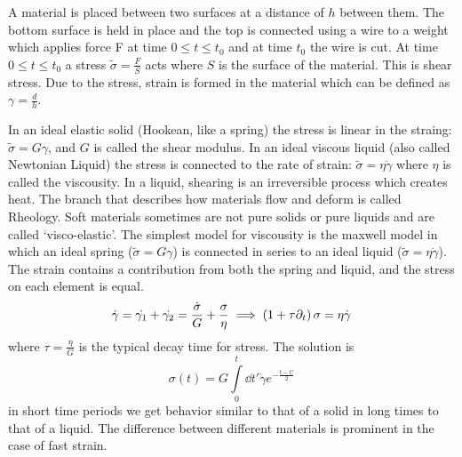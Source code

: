 
A material is placed between two surfaces at a distance of \(h\) between them. The bottom surface is held in place and the top is connected using a wire to a weight which applies force F at time \(0 \leq t \leq t_0\) and at time \(t_0\) the wire is cut. At time \(0 \leq t \leq t_0\) a stress \(\tilde{\sigma} = \frac{F}{S}\) acts where \(S\) is the surface of the material. This is shear stress. Due to the stress, strain is formed in the material which can be defined as \(\gamma = \frac{d}{h}\).


In an ideal elastic solid (Hookean, like a spring) the stress is linear in the straing: \(\tilde{\sigma} = G\gamma\), and \(G\) is called the shear modulus. In an ideal viscous liquid (also called Newtonian Liquid) the stress is connected to the rate of strain: \(\tilde{\sigma} = \eta\dot{\gamma}\) where \(\eta \) is called the viscousity. In a liquid, shearing is an irreversible process which creates heat. The branch that describes how materials flow and deform is called Rheology. Soft materials sometimes are not pure solids or pure liquids and are called `visco-elastic'.  The simplest model for viscousity is the maxwell model in which an ideal spring (\(\tilde{\sigma}=G\gamma \)) is connected in series to an ideal liquid (\(\tilde{\sigma} = \eta\dot{\gamma}\)). The strain contains a contribution from both the spring and liquid, and the stress on each element is equal.
\begin{equation}
    \dot{\gamma} = \dot{\gamma_1}+\dot{\gamma_2} = \frac{\dot{\sigma}}{G}+\frac{\sigma}{\eta} \implies \left(1 + \tau\partial_t\right)\sigma = \eta\dot{\gamma}
\end{equation}
where \(\tau=\frac{\eta}{G}\) is the typical decay time for stress. The solution is
\begin{equation}
    \sigma(t) = G \int\limits_0^t\dd t' \dot{\gamma} e^{-\frac{t-t'}{2}}
\end{equation}
in short time periods we get behavior similar to that of a solid in long times to that of a liquid. The difference between different materials is prominent in the case of fast strain.


